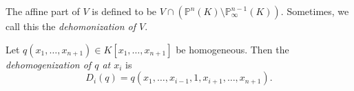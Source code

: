 
\begin{defn}
	The affine part of $V$ is defined to be $V \cap \left(\mathbb{P}^n(K) \setminus \mathbb{P}^{n-1}_\infty(K)\right)$. Sometimes, we call this the \emph{dehomonization of $V$}.
\end{defn}

\begin{defn}
	Let $q(x_1, \dots, x_{n+1}) \in K[x_1, \dots, x_{n+1}]$ be homogeneous. Then the \emph{dehomogenization of $q$ at  $x_i$} is \[
		D_{i}(q) = q(x_1, \dots, x_{i-1}, 1, x_{i+1}, \dots, x_{n+1}).
	\]
\end{defn}
